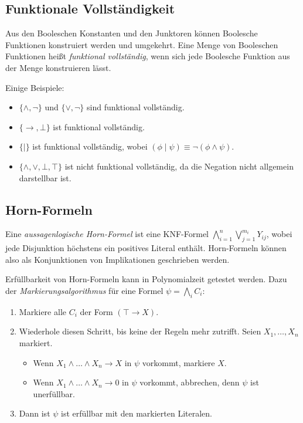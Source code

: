 \documentclass{panikzettel}
\begin{document}
\subsection{Funktionale Vollständigkeit}
Aus den Booleschen Konstanten und den Junktoren können Boolesche Funktionen konstruiert werden und umgekehrt. 
Eine Menge von Booleschen Funktionen heißt \emph{funktional vollständig}, wenn sich jede Boolesche Funktion aus der Menge konstruieren lässt.

Einige Beispiele:
\begin{itemize}
  \item $\{\land, \lnot\}$ und $\{\lor, \lnot\}$ sind funktional vollständig.
  \item $\{\to,\bot\}$ ist funktional vollständig.
  \item $\{\mid\}$ ist funktional vollständig, wobei $(\phi\mid\psi)\equiv\lnot(\phi \land \psi)$.
  \item $\{\land,\lor,\bot,\top\}$ ist nicht funktional vollständig, da die Negation nicht allgemein darstellbar ist.
\end{itemize}

\subsection{Horn-Formeln}

Eine \emph{aussagenlogische Horn-Formel} ist eine KNF-Formel $\bigwedge_{i=1}^n \bigvee_{j=1}^{m_i} Y_{ij}$, wobei jede Disjunktion höchstens ein positives Literal enthält. Horn-Formeln können also als Konjunktionen von Implikationen geschrieben werden.

Erfüllbarkeit von Horn-Formeln kann in Polynomialzeit getestet werden. Dazu der \emph{Markierungsalgorithmus} für eine Formel $\psi = \bigwedge_i C_i$:
\begin{enumerate}
  \item Markiere alle $C_i$ der Form $(\top \to X)$.
  \item Wiederhole diesen Schritt, bis keine der Regeln mehr zutrifft. Seien $X_1, \ldots, X_n$ markiert.
  \begin{itemize}
    \item Wenn $X_1 \land \ldots \land X_n \to X$ in $\psi$ vorkommt, markiere $X$.
    \item Wenn $X_1 \land \ldots \land X_n \to 0$ in $\psi$ vorkommt, abbrechen, denn $\psi$ ist unerfüllbar.
  \end{itemize}
  \item Dann ist $\psi$ ist erfüllbar mit den markierten Literalen.
\end{enumerate}
\end{document}
